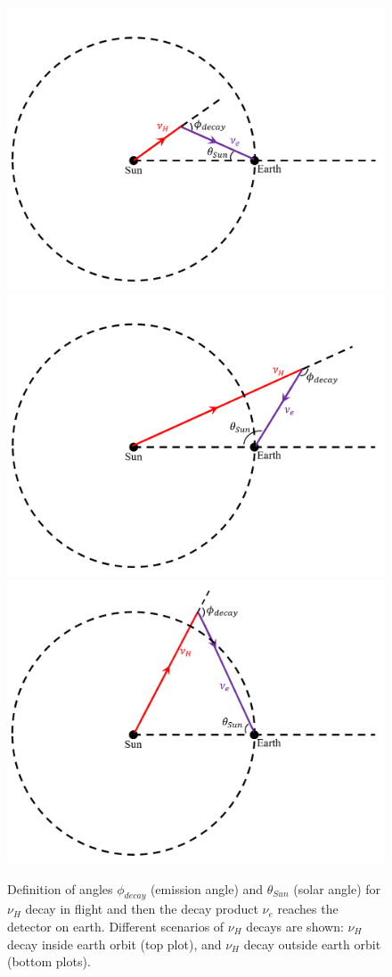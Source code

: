 \documentclass[%
 reprint,
 amsmath,amssymb,
 aps,
 prd,
floatfix,
twocolumn,
]{revtex4-1}
\begin{document}
\begin{figure}[!htbp]
    \includegraphics[width=0.55\columnwidth]{figs/decay_inflight_sketch1.png}\\
    \includegraphics[width=0.45\columnwidth]{figs/decay_inflight_sketch2.png}
    \includegraphics[width=0.45\columnwidth]{figs/decay_inflight_sketch3.png}
\caption{Definition of angles $\phi_{decay}$ (emission angle) and $\theta_{Sun}$ (solar angle) for $\nu_H$ decay in flight and then the decay product $\nu_e$ reaches the detector on earth. Different scenarios of $\nu_H$ decays are shown: $\nu_H$ decay inside earth orbit (top plot), and $\nu_H$ decay outside earth orbit (bottom plots).}
\label{fig:decay_inflight_sketch} 
\end{figure}
\end{document}
